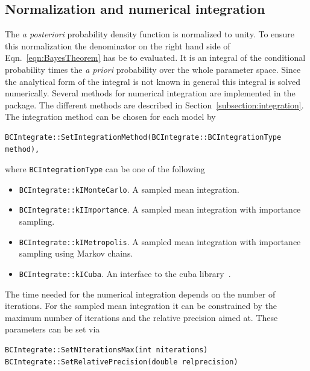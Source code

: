 \documentclass[11pt, a4paper]{article}
\begin{document}

\subsection{Normalization and numerical integration} 
\label{section:normalization} 

The {\it a posteriori} probability density function is normalized to
unity. To ensure this normalization the denominator on the right hand
side of Eqn.~\ref{eqn:BayesTheorem} has be to evaluated. It is an
integral of the conditional probability times the {\it a priori}
probability over the whole parameter space. Since the analytical form
of the integral is not known in general this integral is solved
numerically. Several methods for numerical integration are implemented
in the package. The different methods are described in
Section~\ref{subsection:integration}. \\

\noindent 
The integration method can be chosen for each model by 
%
\begin{verbatim}
BCIntegrate::SetIntegrationMethod(BCIntegrate::BCIntegrationType method), 
\end{verbatim} 

\noindent
where \verb|BCIntegrationType| can be one of the following 
% 
\begin{itemize}
\item \verb|BCIntegrate::kIMonteCarlo|. A sampled mean integration.
\item \verb|BCIntegrate::kIImportance|. A sampled mean integration
 with importance sampling.  
\item \verb|BCIntegrate::kIMetropolis|. A sampled mean integration
 with importance sampling using Markov chains. 
\item \verb|BCIntegrate::kICuba|. An interface to the cuba
 library~\cite{Hahn:2004fe}.
\end{itemize}

\noindent 
The time needed for the numerical integration depends on the number of
iterations. For the sampled mean integration it can be constrained by
the maximum number of iterations and the relative precision aimed
at. These parameters can be set via
%
\begin{verbatim}
BCIntegrate::SetNIterationsMax(int niterations)
BCIntegrate::SetRelativePrecision(double relprecision) 
\end{verbatim} 
\end{document}
